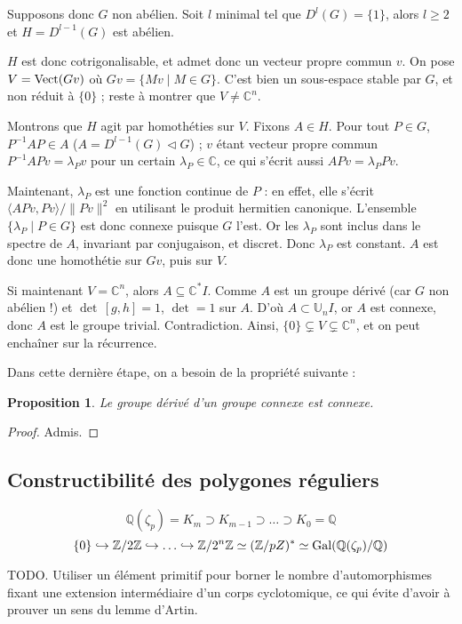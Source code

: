 \documentclass[a4paper, 11pt]{article}
\def\Z{\mathbb{Z}}
\def\Q{\mathbb{Q}}
\def\C{\mathbb{C}}
\def\Vect{\textnormal{Vect}}
\newtheorem*{proposition}{Proposition}
\begin{document}
Supposons donc $G$ non abélien. Soit $l$ minimal tel que $D^l(G) = \{1\}$, alors
$l \geq 2$ et $H = D^{l-1}(G)$ est abélien.

$H$ est donc cotrigonalisable, et admet donc un vecteur propre commun $v$. On
pose $V = \Vect(Gv)$ où $Gv = \{Mv \mid M \in G\}$. C'est bien un sous-espace
stable par $G$, et non réduit à $\{0\}$ ; reste à montrer que $V \neq \C^n$.

Montrons que $H$ agit par homothéties sur $V$. Fixons $A \in H$. Pour tout $P
\in G$, $P^{-1}AP \in A$ ($A = D^{l-1}(G) \triangleleft G$) ; $v$ étant vecteur
propre commun $P^{-1}APv = \lambda_P v$ pour un certain $\lambda_P \in \C$, ce
qui s'écrit aussi $APv = \lambda_P Pv$.

Maintenant, $\lambda_P$ est une fonction continue de $P$ : en effet, elle
s'écrit $\langle APv, Pv \rangle / \|Pv\|^2$ en utilisant le produit hermitien
canonique. L'ensemble $\{ \lambda_P \mid P \in G \}$ est donc connexe puisque
$G$ l'est. Or les $\lambda_P$ sont inclus dans le spectre de $A$, invariant par
conjugaison, et discret. Donc $\lambda_P$ est constant. $A$ est donc une
homothétie sur $Gv$, puis sur $V$.

Si maintenant $V = \C^n$, alors $A \subseteq \C^*I$. Comme $A$ est un groupe
dérivé (car $G$ non abélien !) et $\det\,[g,h] = 1$, $\det = 1$ sur $A$. D'où $A
\subset \mathbb{U}_nI$, or $A$ est connexe, donc $A$ est le groupe trivial.
Contradiction. Ainsi, $\{0\} \subsetneq V \subsetneq \C^n$, et on peut enchaîner
sur la récurrence.

Dans cette dernière étape, on a besoin de la propriété suivante :
\begin{proposition}
  Le groupe dérivé d'un groupe connexe est connexe.
\end{proposition}
\begin{proof}
  Admis.
\end{proof}

\newpage


\subsection{Constructibilité des polygones réguliers}

\[ \Q(\zeta_p) = K_m \supset K_{m-1} \supset \ldots \supset K_0 = \Q \]
\[ \{0\} \hookrightarrow \Z/2\Z \hookrightarrow \ldots \hookrightarrow \Z/2^n\Z
  \simeq (\Z/pZ)^* \simeq \textnormal{Gal}(\Q(\zeta_p)/\Q) \]

TODO. Utiliser un élément primitif pour borner le nombre d'automorphismes fixant
une extension intermédiaire d'un corps cyclotomique, ce qui évite d'avoir à
prouver un sens du lemme d'Artin.
\end{document}
